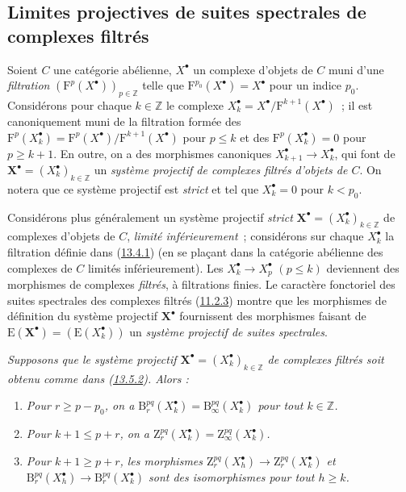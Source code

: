 \subsection{Limites projectives de suites spectrales de complexes filtrés}
\label{subsection:0.13.5-fr}
\begin{env}[13.5.1]
\label{0.13.5.1-fr}
Soient $C$ une catégorie abélienne, $X^\bullet$ un complexe d'objets de
$C$ muni d'une \emph{filtration}
$(\mathrm F^p(X^\bullet))_{p\in\mathbb Z}$ telle que
$\mathrm F^{p_0}(X^\bullet)=X^\bullet$ pour un indice $p_0$.
Considérons pour chaque $k\in\mathbb Z$ le complexe
$X_k^\bullet=X^\bullet/\mathrm F^{k+1}(X^\bullet)$~; il est canoniquement
muni de la filtration formée des
$\mathrm F^p(X_k^\bullet)=
\mathrm F^p(X^\bullet)/\mathrm F^{k+1}(X^\bullet)$ pour $p\leq k$ et des
$\mathrm F^p(X_k^\bullet)=0$ pour $p\geq k+1$. En outre, on a des
morphismes canoniques $X_{k+1}^\bullet\to X_k^\bullet$, qui font de
$\mathbf X^\bullet=(X_k^\bullet)_{k\in\mathbb Z}$ un \emph{système
projectif de complexes filtrés d'objets de $C$}. On notera que ce système
projectif est \emph{strict} et tel que $X_k^\bullet=0$ pour $k<p_0$.
\end{env}
\begin{env}[13.5.2]
\label{0.13.5.2-fr}
Considérons plus généralement un système projectif \emph{strict}
$\mathbf X^\bullet=(X_k^\bullet)_{k\in\mathbb Z}$ de complexes d'objets de
$C$, \emph{limité inférieurement}~; considérons sur chaque
$X_k^\bullet$ la filtration définie dans
(\hyperref[0.13.4.1-fr]{13.4.1}) (en se plaçant dans la catégorie abélienne
des complexes de $C$ limités inférieurement). Les
$X_k^\bullet\to X_p^\bullet$ $(p\leq k)$ deviennent des morphismes de
complexes \emph{filtrés}, à filtrations finies. Le caractère fonctoriel des
suites spectrales des complexes filtrés
(\hyperref[0.11.2.3-fr]{11.2.3}) montre que les morphismes de définition du
système projectif $\mathbf X^\bullet$ fournissent des morphismes faisant de
$\mathrm E(\mathbf X^\bullet)=(\mathrm E(X_k^\bullet))$ un \emph{système
projectif de suites spectrales}.
\end{env}
\begin{lemma}[13.5.3]
\label{0.13.5.3-fr}
\emph{Supposons que le système projectif
$\mathbf X^\bullet=(X_k^\bullet)_{k\in\mathbb Z}$ de complexes filtrés soit
obtenu comme dans (\hyperref[0.13.5.2-fr]{13.5.2}). Alors :}
\begin{enumerate}
\item[\emph{a)}]\emph{Pour $r\geq p-p_0$, on a
$\mathrm B_r^{pq}(X_k^\bullet)=\mathrm B_\infty^{pq}(X_k^\bullet)$ pour
tout $k\in\mathbb Z$.}
\item[\emph{b)}]\emph{Pour $k+1\leq p+r$, on a
$\mathrm Z_r^{pq}(X_k^\bullet)=\mathrm Z_\infty^{pq}(X_k^\bullet)$.}
\item[\emph{c)}]\emph{Pour $k+1\geq p+r$, les morphismes
$\mathrm Z_r^{pq}(X_h^\bullet)\to\mathrm Z_r^{pq}(X_k^\bullet)$ et
$\mathrm B_r^{pq}(X_h^\bullet)\to\mathrm B_r^{pq}(X_k^\bullet)$ sont des
isomorphismes pour tout $h\geq k$.}
\end{enumerate}
\end{lemma}
